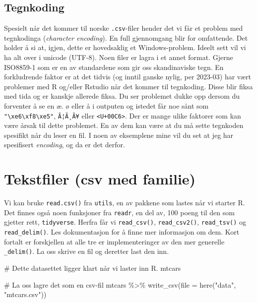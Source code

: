 \documentclass[
  letterpaper,
  DIV=11,
  numbers=noendperiod]{scrreprt}
\newenvironment{Shaded}{\begin{snugshade}}{\end{snugshade}}
\newcommand{\AttributeTok}[1]{\textcolor[rgb]{0.40,0.45,0.13}{#1}}
\newcommand{\CommentTok}[1]{\textcolor[rgb]{0.37,0.37,0.37}{#1}}
\newcommand{\FunctionTok}[1]{\textcolor[rgb]{0.28,0.35,0.67}{#1}}
\newcommand{\NormalTok}[1]{\textcolor[rgb]{0.00,0.23,0.31}{#1}}
\newcommand{\SpecialCharTok}[1]{\textcolor[rgb]{0.37,0.37,0.37}{#1}}
\newcommand{\StringTok}[1]{\textcolor[rgb]{0.13,0.47,0.30}{#1}}
\begin{document}
\hypertarget{sec-tegnkoding}{%
\subsection{Tegnkoding}\label{sec-tegnkoding}}

Spesielt når det kommer til norske \texttt{.csv}-filer hender det vi får
et problem med tegnkodinga (\emph{character encoding}). En full
gjennomgang blir for omfattende. Det holder å si at, igjen, dette er
hovedsaklig et Windows-problem. Ideelt sett vil vi ha alt over i unicode
(UTF-8). Noen filer er lagra i et annet format. Gjerne ISO8859-1 som er
en av standardene som gir oss skandinaviske tegn. En forkludrende faktor
er at det tidvis (og inntil ganske nylig, per 2023-03) har vært
problemer med R og/eller Rstudio når det kommer til tegnkoding. Disse
blir fiksa med tida og er kanskje allerede fiksa. Du ser problemet dukke
opp dersom du forventer å se en æ. ø eller å i outputen og istedet får
noe sånt som
\texttt{"\textbackslash{}xe6\textbackslash{}xf8\textbackslash{}xe5"},
\texttt{Ã¦Ã¸Ã¥} eller \texttt{\textless{}U+00C6\textgreater{}}. Der er
mange ulike faktorer som kan være årsak til dette problemet. En av dem
kan være at du må sette tegnkoden spesifikt når du leser en fil. I noen
av eksemplene mine vil du set at jeg har spesifisert \emph{encoding}, og
da er det derfor.

\hypertarget{tekstfiler-csv-med-familie}{%
\section{Tekstfiler (csv med
familie)}\label{tekstfiler-csv-med-familie}}

Vi kan bruke \texttt{read.csv()} fra \texttt{utils}, en av pakkene som
lastes når vi starter R. Det finnes også noen funksjoner fra
\texttt{readr}, en del av, 100 poeng til den som gjetter rett,
\texttt{tidyverse}. Herfra får vi \texttt{read\_csv()},
\texttt{read\_csv2()}, \texttt{read\_tsv()} og \texttt{read\_delim()}.
Les dokumentasjon for å finne mer informasjon om dem. Kort fortalt er
forskjellen at alle tre er implementeringer av den mer generelle
\texttt{\_delim()}. La oss skrive en fil og deretter last den inn.

\begin{Shaded}
\begin{Highlighting}[]
\CommentTok{\# Dette datasettet ligger klart når vi laster inn R.}
\NormalTok{mtcars}

\CommentTok{\# La oss lagre det som en csv{-}fil}
\NormalTok{mtcars }\SpecialCharTok{\%\textgreater{}\%} 
  \FunctionTok{write\_csv}\NormalTok{(}\AttributeTok{file =} \FunctionTok{here}\NormalTok{(}\StringTok{"data"}\NormalTok{, }\StringTok{"mtcars.csv"}\NormalTok{))}
\end{Highlighting}
\end{Shaded}
\end{document}
